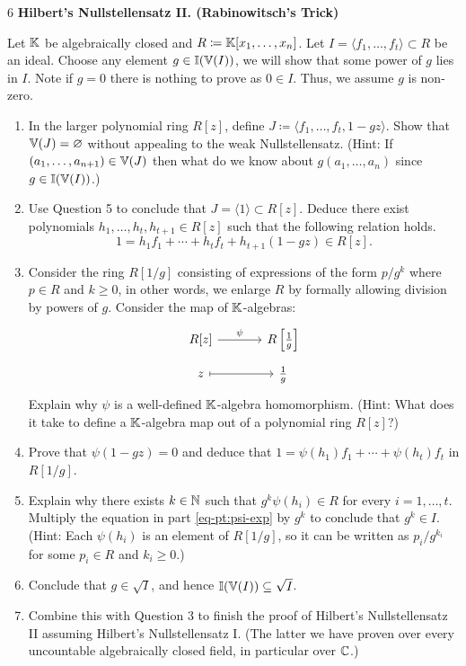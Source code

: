 \documentclass[Notebook.tex]{subfiles}
\begin{document}
\begin{problem}{6}
    \textbf{Hilbert's Nullstellensatz II. (Rabinowitsch's Trick)}  
    
    Let $\mathbb K$ be algebraically closed  and  $R\coloneqq \mathbb K[x_1,\ldots,x_n]$. Let $I=\langle f_1,\ldots,f_t\rangle \subset R$ be an ideal. Choose any element $g \in \mathbb I(\mathbb V(I))$, we will show that some power of $g$ lies in $I$. Note if $g=0$ there is nothing to prove as $0\in I$. Thus, we assume $g$ is non-zero. 
    \begin{enumerate}
        \item In the larger polynomial ring $R[z]$, define $J\coloneqq \langle f_1,\ldots,f_t,1-gz\rangle$. Show that $\mathbb V(J)=\varnothing$ without appealing to the weak Nullstellensatz. (Hint: If $(a_1,\ldots,a_{n+1}) \in \mathbb V(J)$ then what do we know about $g(a_1,\ldots,a_n)$ since $g\in \mathbb I(\mathbb V(I))$.)
        \item Use Question 5 to conclude that $J=\langle 1\rangle \subset R[z]$. Deduce there exist polynomials $h_1,\ldots,h_t,h_{t+1} \in R[z]$ such that the following relation holds. 
        \[
        1=h_1f_1+\cdots+h_tf_t+h_{t+1}(1-gz) \in R[z].
        \]
        \item Consider the ring $R[1/g]$ consisting of expressions of the form $p/g^k$ where $p\in R$ and $k\geq 0$, in other words, we enlarge $R$ by formally allowing division by powers of $g$. Consider the map of $\mathbb K$-algebras:
        \[
        \begin{tikzcd}[row sep = .5em, column sep = 3.5em]
        R[z]\arrow[r, "\psi"] & R\left[\frac{1}{g}\right] \\
        z \arrow[r, mapsto] & \frac{1}{g}
        \end{tikzcd}
        \]
        Explain why $\psi$ is a well-defined $\mathbb K$-algebra homomorphism. (Hint: What does it take to define a $\mathbb K$-algebra map out of a polynomial ring $R[z]$?)
        \item\label{eq-pt:psi-exp} Prove that $\psi(1-gz)=0$ and deduce that $1=\psi(h_1)f_1+\cdots+\psi(h_t)f_t$ in $R[1/g]$.
        \item Explain why there exists $k\in \mathbb N$ such that $g^k\psi(h_i)\in R$ for every $i=1,\ldots,t$. Multiply the equation in part \ref{eq-pt:psi-exp} by $g^k$ to conclude that $g^k\in I$. (Hint: Each $\psi(h_i)$ is an element of $R[1/g]$, so it can be written as $p_i/g^{k_i}$ for some $p_i\in R$ and $k_i\geq 0$.)
        \item Conclude that $g\in \sqrt{I}$, and hence $\mathbb I(\mathbb V(I))\subseteq \sqrt{I}$.
        \item Combine this with Question 3 to finish the proof of Hilbert's Nullstellensatz II assuming Hilbert's Nullstellensatz I. (The latter we have proven over every uncountable algebraically closed field, in particular over $\mathbb C$.)
    \end{enumerate}
\end{problem}
\end{document}
